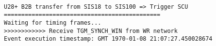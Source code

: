 \begin{lstlisting}[language={[ANSI]C}, keywordstyle=\color{blue!70}, commentstyle=\color{red!50!green!50!blue!50}, frame=shadowbox, rulesepcolor=\color{red!20!green!20!blue!20}]

U28+ B2B transfer from SIS18 to SIS100 => Trigger SCU
=============================================
Waiting for timing frames...
>>>>>>>>>>>> Receive TGM_SYNCH_WIN from WR network
Event execution timestamp: GMT 1970-01-08 21:07:27.450028674
\end{lstlisting}


%
%

